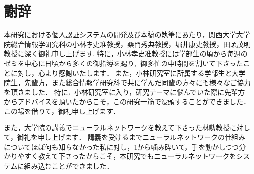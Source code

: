 \chapter*{謝辞}
本研究における個人認証システムの開発及び本稿の執筆にあたり，関西大学大学院総合情報学研究科の小林孝史准教授，桑門秀典教授，堀井康史教授，田頭茂明教授に深く御礼申し上げます.
特に，小林孝史准教授には学部生の頃から毎週のゼミを中心に日頃から多くの御指導を賜り，御多忙の中時間を割いて下さったことに対し，心より感謝いたします．
また，小林研究室に所属する学部生と大学院生，先輩方，また総合情報学研究科で共に学んだ同輩の方々にも様々なご協力を頂きました．
特に，小林研究室に入り，研究テーマに悩んでいた際に先輩方からアドバイスを頂いたからこそ，この研究一筋で没頭することができました．
この場を借りて，御礼申し上げます．

また，大学院の講義でニューラルネットワークを教えて下さった林勲教授に対して，御礼を申し上げます．
講義を受けるまでニューラルネットワークの仕組みについてほぼ何も知らなかった私に対し，1から噛み砕いて，手を動かしつつ分かりやすく教えて下さったからこそ，本研究でもニューラルネットワークをシステムに組み込むことができました．
